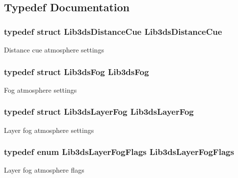 \subsection{Typedef Documentation}
\hypertarget{group__atmosphere_gacf8a7ebc9666452b13e6051cfae4a0ff}{
\subsubsection[{Lib3ds\-Distance\-Cue}]{\setlength{\rightskip}{0pt plus 5cm}typedef {\bf struct} {\bf Lib3ds\-Distance\-Cue}  {\bf Lib3ds\-Distance\-Cue}}}\label{group__atmosphere_gacf8a7ebc9666452b13e6051cfae4a0ff}
Distance cue atmosphere settings \hypertarget{group__atmosphere_ga535f2ed79f887427106dd66660b2d761}{
\subsubsection[{Lib3ds\-Fog}]{\setlength{\rightskip}{0pt plus 5cm}typedef {\bf struct} {\bf Lib3ds\-Fog}  {\bf Lib3ds\-Fog}}}\label{group__atmosphere_ga535f2ed79f887427106dd66660b2d761}
Fog atmosphere settings \hypertarget{group__atmosphere_ga0855ca24eb5e54e027da9515081e7d08}{
\subsubsection[{Lib3ds\-Layer\-Fog}]{\setlength{\rightskip}{0pt plus 5cm}typedef {\bf struct} {\bf Lib3ds\-Layer\-Fog}  {\bf Lib3ds\-Layer\-Fog}}}\label{group__atmosphere_ga0855ca24eb5e54e027da9515081e7d08}
Layer fog atmosphere settings \hypertarget{group__atmosphere_ga908e92770698e21466f8797cefb026c0}{
\subsubsection[{Lib3ds\-Layer\-Fog\-Flags}]{\setlength{\rightskip}{0pt plus 5cm}typedef enum {\bf Lib3ds\-Layer\-Fog\-Flags}  {\bf Lib3ds\-Layer\-Fog\-Flags}}}\label{group__atmosphere_ga908e92770698e21466f8797cefb026c0}
Layer fog atmosphere flags 

